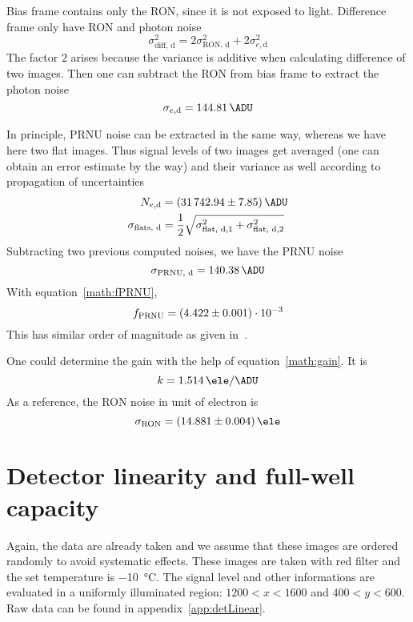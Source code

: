 Bias frame contains only the RON, since it is not exposed to light. Difference frame only have RON and photon noise
\begin{equation*}
	\sigma^2_\text{diff, d} = 2\sigma^2_\text{RON, d} + 2\sigma^2_{e, \text{d}}
\end{equation*}
The factor $2$ arises because the variance is additive when calculating difference of two images. Then one can subtract the RON from bias frame to extract the photon noise
\begin{equation}
	\sigma_{e, \text{d}} = \SI{144.81}{\ADU}
\end{equation}

In principle, PRNU noise can be extracted in the same way, whereas we have here two flat images. Thus signal levels of two images get averaged (one can obtain an error estimate by the way) and their variance as well according to propagation of uncertainties
\begin{align*}
	N_{e, \text{d}} &= \SI{31742.94 +- 7.85}{\ADU} \\
	\sigma_\text{flats, d} &= \frac{1}{2} \sqrt{\sigma^2_{\text{flat, d}, 1} + \sigma^2_{\text{flat, d}, 2}}
\end{align*}
Subtracting two previous computed noises, we have the PRNU noise
\begin{equation}
	\sigma_\text{PRNU, d} = \SI{140.38}{\ADU}	
\end{equation}
With equation~\ref{math:fPRNU},
\begin{equation}
	f_\text{PRNU} = (\num{4.422 +- 0.001}) \cdot 10^{-3}
\end{equation}
This has similar order of magnitude as given in~\cite{manual}.

One could determine the gain with the help of equation~\ref{math:gain}. It is
\begin{equation}
	k = \SI{1.514 +- 0.000}{\ele\per\ADU}
\end{equation}
As a reference, the RON noise in unit of electron is
\begin{equation}
	\sigma_\text{RON} = \SI{14.881 +- 0.004}{\ele}
\end{equation}

\section{Detector linearity and full-well capacity}\label{sec:linear}
Again, the data are already taken and we assume that these images are ordered randomly to avoid systematic effects. These images are taken with red filter and the set temperature is \SI{-10}{\degreeCelsius}. The signal level and other informations are evaluated in a uniformly illuminated region: $1200 < x < 1600$ and $400 < y < 600$. Raw data can be found in appendix~\ref{app:detLinear}.

